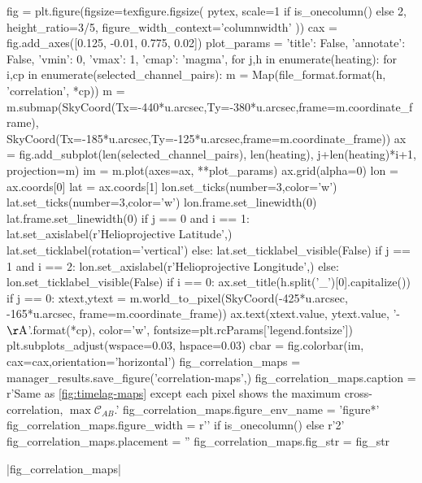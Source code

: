 \begin{pycode}
fig = plt.figure(figsize=texfigure.figsize(
    pytex,
    scale=1 if is_onecolumn() else 2,
    height_ratio=3/5,
    figure_width_context='columnwidth'
))
cax = fig.add_axes([0.125, -0.01, 0.775, 0.02])
plot_params = {'title': False, 'annotate': False, 'vmin': 0, 'vmax': 1, 'cmap': 'magma',}
for j,h in enumerate(heating):
    for i,cp in enumerate(selected_channel_pairs):
        m = Map(file_format.format(h, 'correlation', *cp))
        m = m.submap(SkyCoord(Tx=-440*u.arcsec,Ty=-380*u.arcsec,frame=m.coordinate_frame),
                     SkyCoord(Tx=-185*u.arcsec,Ty=-125*u.arcsec,frame=m.coordinate_frame))
        ax = fig.add_subplot(len(selected_channel_pairs), len(heating), j+len(heating)*i+1,
                             projection=m)
        im = m.plot(axes=ax, **plot_params)
        ax.grid(alpha=0)
        lon = ax.coords[0]
        lat = ax.coords[1]
        lon.set_ticks(number=3,color='w')
        lat.set_ticks(number=3,color='w')
        lon.frame.set_linewidth(0)
        lat.frame.set_linewidth(0)
        if j == 0 and i == 1:
            lat.set_axislabel(r'Helioprojective Latitude',)
            lat.set_ticklabel(rotation='vertical')
        else:
            lat.set_ticklabel_visible(False)
        if j == 1 and i == 2:
            lon.set_axislabel(r'Helioprojective Longitude',)
        else:
            lon.set_ticklabel_visible(False)
        if i == 0:
            ax.set_title(h.split('_')[0].capitalize())
        if j == 0:
            xtext,ytext = m.world_to_pixel(SkyCoord(-425*u.arcsec, -165*u.arcsec, frame=m.coordinate_frame))
            ax.text(xtext.value, ytext.value, '{}-{} $\mathrm{{\AA}}$'.format(*cp),
                    color='w', fontsize=plt.rcParams['legend.fontsize'])
plt.subplots_adjust(wspace=0.03, hspace=0.03)
cbar = fig.colorbar(im, cax=cax,orientation='horizontal')
fig_correlation_maps = manager_results.save_figure('correlation-maps',)
fig_correlation_maps.caption = r'Same as \autoref{fig:timelag-maps} except each pixel shows the maximum cross-correlation, $\max\mathcal{C}_{AB}$.'
fig_correlation_maps.figure_env_name = 'figure*'
fig_correlation_maps.figure_width = r'\columnwidth' if is_onecolumn() else r'2\columnwidth'
fig_correlation_maps.placement = ''
fig_correlation_maps.fig_str = fig_str
\end{pycode}
|fig_correlation_maps|

